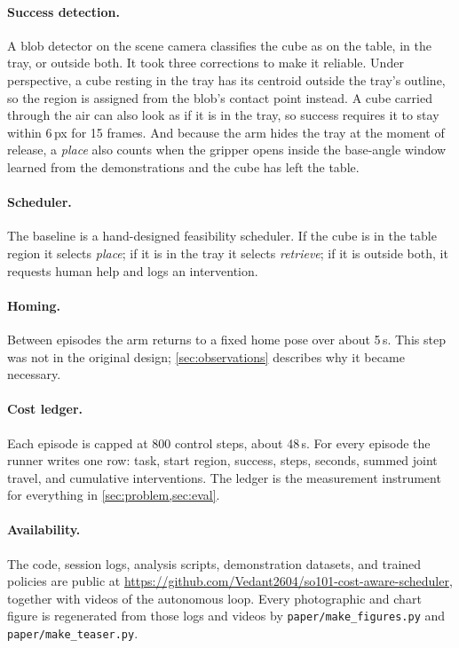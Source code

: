 \documentclass[runningheads]{llncs}
\newcommand{\task}[1]{\textit{#1}}
\begin{document}
\paragraph{Success detection.}
A blob detector on the scene camera classifies the cube as on the table, in the tray, or outside both. It took three corrections to make it reliable. Under perspective, a cube resting in the tray has its centroid outside the tray's outline, so the region is assigned from the blob's contact point instead. A cube carried through the air can also look as if it is in the tray, so success requires it to stay within 6\,px for 15 frames. And because the arm hides the tray at the moment of release, a \task{place} also counts when the gripper opens inside the base-angle window learned from the demonstrations and the cube has left the table.

\paragraph{Scheduler.}
The baseline is a hand-designed feasibility scheduler. If the cube is in the table region it selects \task{place}; if it is in the tray it selects \task{retrieve}; if it is outside both, it requests human help and logs an intervention.

\paragraph{Homing.}
Between episodes the arm returns to a fixed home pose over about 5\,s. This step was not in the original design; \cref{sec:observations} describes why it became necessary.

\paragraph{Cost ledger.}
Each episode is capped at 800 control steps, about 48\,s. For every episode the runner writes one row: task, start region, success, steps, seconds, summed joint travel, and cumulative interventions. The ledger is the measurement instrument for everything in \cref{sec:problem,sec:eval}.

\paragraph{Availability.}
The code, session logs, analysis scripts, demonstration datasets, and trained policies are public at \url{https://github.com/Vedant2604/so101-cost-aware-scheduler}, together with videos of the autonomous loop. Every photographic and chart figure is regenerated from those logs and videos by \texttt{paper/make\_figures.py} and \texttt{paper/make\_teaser.py}.
\end{document}
